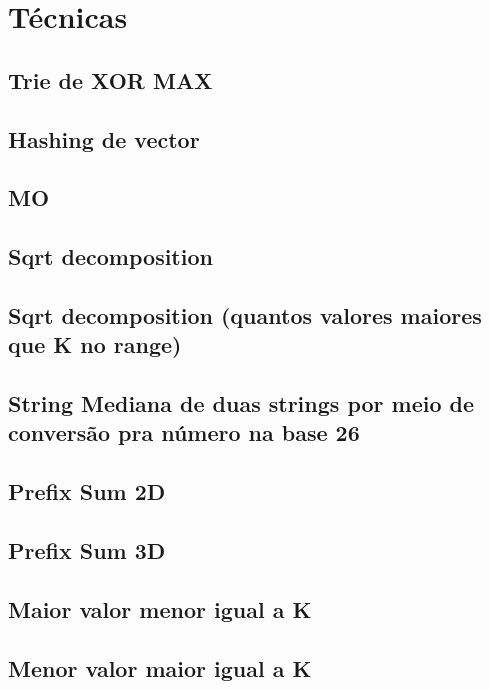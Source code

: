 \section{Técnicas}

\subsection{Trie de XOR MAX}


\subsection{Hashing de vector}


\subsection{MO}


\subsection{Sqrt decomposition}


\subsection{Sqrt decomposition (quantos valores maiores que K no range)}


\subsection{String Mediana de duas strings por meio de conversão pra número na base 26}


\subsection{Prefix Sum 2D}


\subsection{Prefix Sum 3D}


\subsection{Maior valor menor igual a K}


\subsection{Menor valor maior igual a K}
